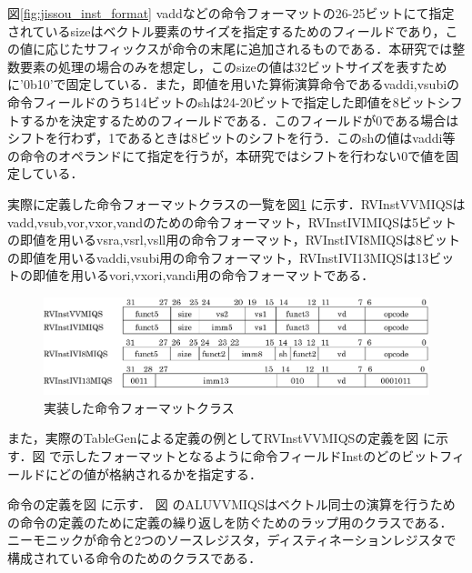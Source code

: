 図\ref{fig:jissou_inst_format}
vaddなどの命令フォーマットの26-25ビットにて指定されているsizeはベクトル要素のサイズを指定するためのフィールドであり，この値に応じたサフィックスが命令の末尾に追加されるものである．本研究では整数要素の処理の場合のみを想定し，このsizeの値は32ビットサイズを表すために'0b10'で固定している．また，即値を用いた算術演算命令であるvaddi,vsubiの命令フィールドのうち14ビットのshは24-20ビットで指定した即値を8ビットシフトするかを決定するためのフィールドである．このフィールドが0である場合はシフトを行わず，1であるときは8ビットのシフトを行う．このshの値はvaddi等の命令のオペランドにて指定を行うが，本研究ではシフトを行わない0で値を固定している．

実際に定義した命令フォーマットクラスの一覧を図\ref{fig:jissou_inst_format_class}
に示す．RVInstVVMIQSはvadd,vsub,vor,vxor,vandのための命令フォーマット，RVInstIVIMIQSは5ビットの即値を用いるvsra,vsrl,vsll用の命令フォーマット，RVInstIVI8MIQSは8ビットの即値を用いるvaddi,vsubi用の命令フォーマット，RVInstIVI13MIQSは13ビットの即値を用いるvori,vxori,vandi用の命令フォーマットである．

\begin{figure}[tb]
    \centering
    \includegraphics[scale=0.8]{image/jissou_inst_format_class.pdf}
    \caption{実装した命令フォーマットクラス}
    \label{fig:jissou_inst_format_class}
\end{figure}

また，実際のTableGenによる定義の例としてRVInstVVMIQSの定義を図%
に示す．図%
で示したフォーマットとなるように命令フィールドInstのどのビットフィールドにどの値が格納されるかを指定する．

命令の定義を図%
に示す．
図%
のALUVVMIQSはベクトル同士の演算を行うための命令の定義のために定義の繰り返しを防ぐためのラップ用のクラスである．
ニーモニックが命令と2つのソースレジスタ，ディスティネーションレジスタで構成されている命令のためのクラスである．